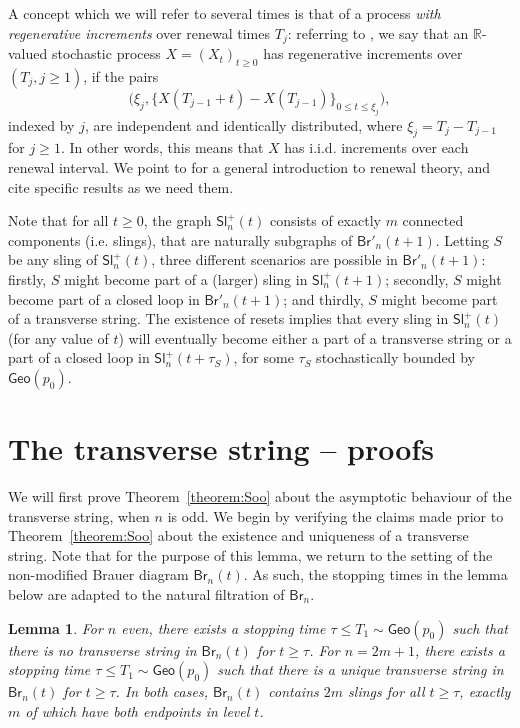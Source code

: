 \documentclass[a4paper,11pt,reqno]{amsart}
\newcommand{\IR}{\mathbb{R}}
\newcommand{\Br}{\mathsf{Br}}
\newcommand{\Slr}{\mathsf{Sl}^+}
\newcommand{\Geo}{\mathsf{Geo}}
\newtheorem{lemma}{Lemma}
\theoremstyle{definition}
\begin{document}
A concept which we will refer to several times is that of a process \emph{with regenerative increments} over renewal times $T_j$: referring to \cite[Definition~2.52]{Serfozo09}, we say that an $\IR$-valued stochastic process $X=(X_t)_{t\geq0}$ has regenerative increments over $(T_j, j\geq 1)$, if the pairs 
\[
 \big(\xi_j,\{X(T_{j-1}+t) - X(T_{j-1})\}_{0\leq t\leq \xi_j}\big),
\]
indexed by $j$, are independent and identically distributed, where $\xi_j=T_j-T_{j-1}$ for $j\geq 1$. In other words, this means that $X$ has i.i.d. increments over each renewal interval. We point to \cite[Chapter~2]{Serfozo09} for a general introduction to renewal theory, and cite specific results as we need them. 

Note that for all $t\geq 0$, the graph $\Slr_n(t)$ consists of exactly $m$ connected components (i.e. slings), that are naturally subgraphs of $\Br'_n(t+1)$. Letting $S$ be any sling of $\Slr_n(t)$, three different scenarios are possible in $\Br'_n(t+1)$: firstly, $S$ might become part of a (larger) sling in $\Slr_n(t+1)$; secondly, $S$ might become part of a closed loop in $\Br'_n(t+1)$; and thirdly, $S$ might become part of a transverse string. The existence of resets implies that every sling in $\Slr_n(t)$ (for any value of $t$) will eventually become either a part of a transverse string or a part of a closed loop in $\Slr_n(t+\tau_S)$, for some $\tau_S$ stochastically bounded by $\Geo(p_0)$. 





\section{The transverse string -- proofs}
\label{sec:proofsII}

We will first prove Theorem~\ref{theorem:Soo} about the asymptotic behaviour of the transverse string, when $n$ is odd. We begin by verifying the claims made prior to Theorem~\ref{theorem:Soo} about the existence and uniqueness of a transverse string. Note that for the purpose of this lemma, we return to the setting of the non-modified Brauer diagram $\Br_n(t)$. As such, the stopping times in the lemma below are adapted to the natural filtration of $\Br_n$. 

\begin{lemma}\label{lemma:tau}
For $n$ even, there exists a stopping time $\tau\leq T_1\sim\Geo(p_0)$ such that there is no transverse string in $\Br_n(t)$ for $t \geq \tau$. For $n=2m+1$, there exists a stopping time $\tau\leq T_1\sim\Geo(p_0)$ such that there is a unique transverse string in $\Br_n(t)$ for $t \geq \tau$. In both cases, $\Br_n(t)$ contains $2m$ slings for all $t\geq\tau$, exactly $m$ of which have both endpoints in level $t$. 
\end{lemma}
\end{document}
